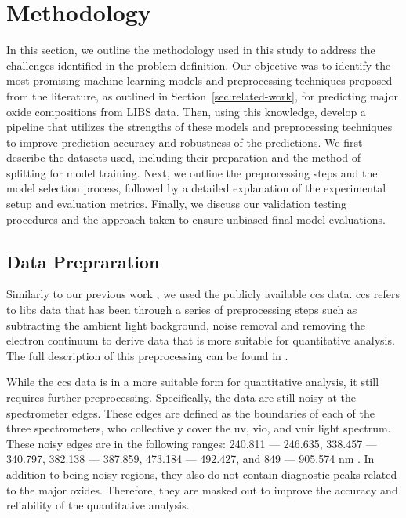 \section{Methodology}\label{sec:methodology}
In this section, we outline the methodology used in this study to address the challenges identified in the problem definition. Our objective was to identify the most promising machine learning models and preprocessing techniques proposed from the literature, as outlined in Section~\ref{sec:related-work}, for predicting major oxide compositions from LIBS data. 
Then, using this knowledge, develop a pipeline that utilizes the strengths of these models and preprocessing techniques to improve prediction accuracy and robustness of the predictions.
We first describe the datasets used, including their preparation and the method of splitting for model training. Next, we outline the preprocessing steps and the model selection process, followed by a detailed explanation of the experimental setup and evaluation metrics. Finally, we discuss our validation testing procedures and the approach taken to ensure unbiased final model evaluations.

\subsection{Data Prepraration}
Similarly to our previous work \cite{p9_paper}, we used the publicly available \gls{ccs} data. 
\gls{ccs} refers to \gls{libs} data that has been through a series of preprocessing steps such as subtracting the ambient light background, noise removal and removing the electron continuum to derive data that is more suitable for quantitative analysis. 
The full description of this preprocessing can be found in \citet{wiensPreFlight3}.

While the \gls{ccs} data is in a more suitable form for quantitative analysis, it still requires further preprocessing.
Specifically, the data are still noisy at the spectrometer edges. These edges are defined as the boundaries of each of the three spectrometers, who collectively cover the \gls{uv}, \gls{vio}, and \gls{vnir} light spectrum.
These noisy edges are in the following ranges: 240.811 — 246.635, 338.457 — 340.797, 382.138 — 387.859, 473.184 — 492.427, and 849 — 905.574 nm .
In addition to being noisy regions, they also do not contain diagnostic peaks related to the major oxides. 
Therefore, they are masked out to improve the accuracy and reliability of the quantitative analysis\citet{cleggRecalibrationMarsScience2017}.

